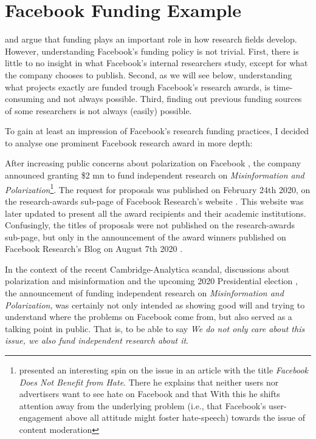 \section{Facebook Funding Example}
\label{sec:fac_fund}
\citet{abdalla_grey_2021} and \citet{oreskes_why_2019} argue that funding plays an important role in how research fields develop.
However, understanding Facebook's funding policy is not trivial.
First, there is little to no insight in what Facebook's internal researchers study, except for what the company chooses to publish.
Second, as we will see below, understanding what projects exactly are funded trough Facebook's research awards, is time-consuming and not always possible.
Third, finding out previous funding sources of some researchers is not always (easily) possible.

To gain at least an impression of Facebook's research funding practices, I decided to analyse one prominent Facebook research award in more depth:

After increasing public concerns about polarization on Facebook \citep{seetharaman_facebook_2020}, the company announced granting \$2 \gls{mn} to fund independent research on \textit{Misinformation and Polarization}\footnote{\citet{clegg_facebook_2020} presented an interesting spin on the issue in an article with the title \emph{Facebook Does Not Benefit from Hate}. There he explains that neither users nor advertisers want to see hate on Facebook and that  With this he shifts attention away from the underlying problem (i.e., that Facebook's user-engagement above all attitude might foster hate-speech) towards the issue of content moderation}.
The request for proposals was published on February 24th 2020, on the research-awards sub-page of Facebook Research's website \citep{facebook_research_foundational_2020}. 
This website was later updated to present all the award recipients and their academic institutions.
Confusingly, the titles of proposals were not published on the research-awards sub-page, but only in the announcement of the award winners published on Facebook Research's Blog on August 7th 2020 \citep{leavitt_announcing_2020}.

In the context of the recent Cambridge-Analytica scandal, discussions about polarization and misinformation and the upcoming 2020 Presidential election \citep{isaac_facebook_2019}, the announcement of funding independent research on \textit{Misinformation and Polarization}, was certainly not only intended as showing good will and trying to understand where the problems on Facebook come from, but also served as a talking point in public. That is, to be able to say \emph{We do not only care about this issue, we also fund independent research about it}.

